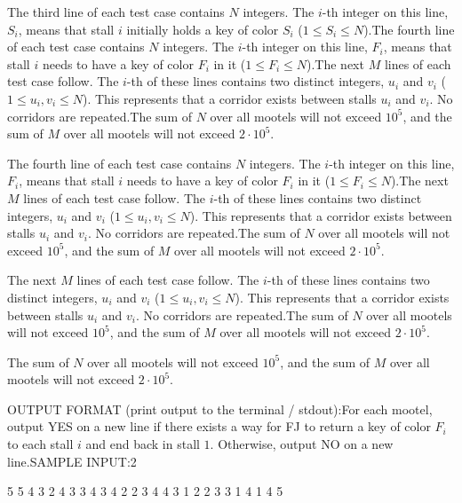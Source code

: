 \documentclass[12pt]{article}
\begin{document}
The third line of each test case contains $N$ integers. The $i$-th integer on
this line, $S_i$, means that stall $i$ initially holds a key of color $S_i$
($1 \le S_i \le N$).The fourth line of each test case contains $N$ integers. The $i$-th integer on
this line, $F_i$, means that stall $i$ needs to have a key of color $F_i$ in it
($1 \le F_i \le N$).The next $M$ lines of each test case follow. The $i$-th of these lines contains
two distinct integers, $u_i$ and $v_i$ ($1 \le u_i, v_i \le N$). This represents
that a corridor exists between stalls $u_i$ and $v_i$. No corridors are
repeated.The sum of $N$ over all mootels will not exceed $10^5$, and the sum of $M$ over
all mootels will not exceed $2\cdot 10^5$.

The fourth line of each test case contains $N$ integers. The $i$-th integer on
this line, $F_i$, means that stall $i$ needs to have a key of color $F_i$ in it
($1 \le F_i \le N$).The next $M$ lines of each test case follow. The $i$-th of these lines contains
two distinct integers, $u_i$ and $v_i$ ($1 \le u_i, v_i \le N$). This represents
that a corridor exists between stalls $u_i$ and $v_i$. No corridors are
repeated.The sum of $N$ over all mootels will not exceed $10^5$, and the sum of $M$ over
all mootels will not exceed $2\cdot 10^5$.

The next $M$ lines of each test case follow. The $i$-th of these lines contains
two distinct integers, $u_i$ and $v_i$ ($1 \le u_i, v_i \le N$). This represents
that a corridor exists between stalls $u_i$ and $v_i$. No corridors are
repeated.The sum of $N$ over all mootels will not exceed $10^5$, and the sum of $M$ over
all mootels will not exceed $2\cdot 10^5$.

The sum of $N$ over all mootels will not exceed $10^5$, and the sum of $M$ over
all mootels will not exceed $2\cdot 10^5$.

OUTPUT FORMAT (print output to the terminal / stdout):For each mootel, output YES on a new line if there exists a way for FJ to return
a key of color $F_i$ to each stall $i$ and end back in stall $1$. Otherwise,
output NO on a new line.SAMPLE INPUT:2

5 5
4 3 2 4 3
3 4 3 4 2
2 3 4 4 3
1 2
2 3
3 1
4 1
4 5
\end{document}

